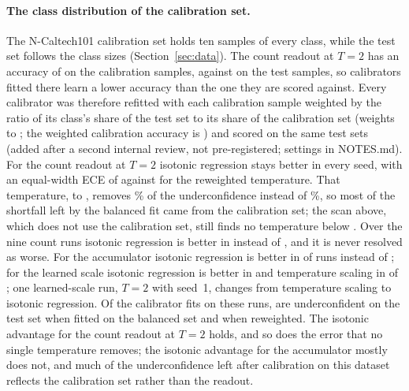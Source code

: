 \documentclass[10pt]{article}
\begin{document}
\paragraph{The class distribution of the calibration set.} The N-Caltech101 calibration set holds
ten samples of every class, while the test set follows the class sizes (Section~\ref{sec:data}).
The count readout at $T=2$ has an accuracy of \calAccNcTwo{} on the calibration samples, against %
\ccAccTwo{} on the test samples, so calibrators fitted there learn a lower accuracy than the one they %
are scored against. Every calibrator was therefore refitted with each calibration sample weighted
by the ratio of its class's share of the test set to its share of the calibration set (weights %
\rwWeightMin{} to \rwWeightMax; the weighted calibration accuracy is \calAccRwNcTwo) and scored on %
the same test sets (added after a second internal review, not pre-registered; settings in NOTES.md).
For the count readout at $T=2$ isotonic regression stays better in every seed, with an equal-width %
ECE of \rwNcTwoIsoW{} against \rwNcTwoTempW{} for the reweighted temperature. That temperature, %
\rwTempNcTwoMin{} to \rwTempNcTwoMax, removes \rwTempRemovesNcTwo\% of the underconfidence instead %
of \tempRemovesNcTwo\%, so most of the shortfall left by the balanced fit came from the calibration
set; the scan above, which does not use the calibration set, still finds no temperature below
\scanNcTwoLowW. Over the nine count runs isotonic regression is better in \rwCountIso{} instead of %
\ncDiffer, and it is never resolved as worse. For the accumulator isotonic regression is %
better in \rwAccumIso{} of \rwAccumRuns{} runs instead of \ccAccumDiffer; for the learned scale %
isotonic regression is better in \rwScaledIso{} and temperature scaling in \rwScaledTemp{} of %
\rwScaledRuns; one learned-scale run, $T=2$ with seed~1, changes from temperature scaling to
isotonic regression. Of the \rwCalibrated{} calibrator fits on these runs, \rwUnderUnw{} are %
underconfident on the test set when fitted on the balanced set and \rwUnderRw{} when reweighted. %
The isotonic advantage for the count readout at $T=2$ holds, and so does the error that no single
temperature removes; the isotonic advantage for the accumulator mostly does not, and much of the underconfidence
left after calibration on this dataset reflects the calibration set rather than the readout.
\end{document}
